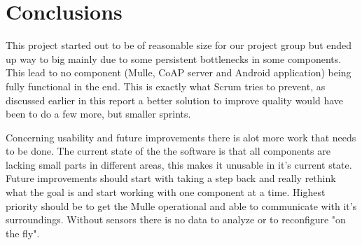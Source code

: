


\section{Conclusions}
This project started out to be of reasonable size for our project group but ended up way to big mainly due to some persistent bottlenecks in some components.
This lead to no component (Mulle, CoAP server and Android application) being fully functional in the end.
This is exactly what Scrum tries to prevent, as discussed earlier in this report a better solution to improve quality would have been to do a few more, but smaller sprints.

Concerning usability and future improvements there is alot more work that needs to be done.
The current state of the the software is that all components are lacking small parts in different areas, this makes it unusable in it's current state.
Future improvements should start with taking a step back and really rethink what the goal is and start working with one component at a time.
Highest priority should be to get the Mulle operational and able to communicate with it's surroundings.
Without sensors there is no data to analyze or to reconfigure "on the fly".
